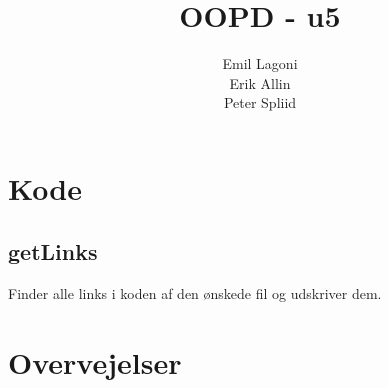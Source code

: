 \documentclass[a4paper,11pt]{article}
\title{\textbf{OOPD - u5}}
\author{Emil Lagoni\\Erik Allin\\Peter Spliid}
\begin{document}
\maketitle

\section*{Kode}
\subsection*{getLinks}
Finder alle links i koden af den ønskede fil og udskriver dem.

\section*{Overvejelser}
\end{document}
